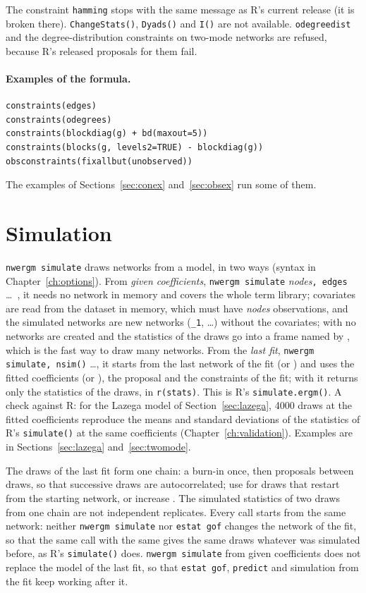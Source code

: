 \normalsize
The constraint \texttt{hamming} stops with the same message as R's current release (it is broken there). \texttt{ChangeStats()}, \texttt{Dyads()} and \texttt{I()} are not available. \texttt{odegreedist} and the degree-distribution constraints on two-mode networks are refused, because R's released proposals for them fail.

\paragraph{Examples of the formula.}
\begin{lstlisting}
constraints(edges)
constraints(odegrees)
constraints(blockdiag(g) + bd(maxout=5))
constraints(blocks(g, levels2=TRUE) - blockdiag(g))
obsconstraints(fixallbut(unobserved))
\end{lstlisting}
The examples of Sections~\ref{sec:conex} and~\ref{sec:obsex} run some of them.

\section{Simulation}\label{sec:simulate}

\texttt{nwergm simulate} draws networks from a model, in two ways (syntax in Chapter~\ref{ch:options}). From \emph{given coefficients}, \texttt{nwergm simulate} \emph{nodes}\texttt{, edges} \ldots\ , it needs no network in memory and covers the whole term library; covariates are read from the dataset in memory, which must have \emph{nodes} observations, and the simulated networks are new networks (\texttt{\_1}, \ldots) without the covariates; with  no networks are created and the statistics of the draws go into a frame named by , which is the fast way to draw many networks. From the \emph{last fit}, \texttt{nwergm simulate}\texttt{, nsim()} \ldots, it starts from the last network of the fit (or ) and uses the fitted coefficients (or ), the proposal and the constraints of the fit; with  it returns only the statistics of the draws, in \texttt{r(stats)}. This is R's \texttt{simulate.ergm()}. A check against R: for the Lazega model of Section~\ref{sec:lazega}, 4000 draws at the fitted coefficients reproduce the means and standard deviations of the statistics of R's \texttt{simulate()} at the same coefficients (Chapter~\ref{ch:validation}). Examples are in Sections~\ref{sec:lazega} and~\ref{sec:twomode}.

The draws of the last fit form one chain: a burn-in once, then  proposals between draws, so that successive draws are autocorrelated; use  for draws that restart from the starting network, or increase . The simulated statistics of two draws from one chain are not independent replicates. Every call starts from the same network: neither \texttt{nwergm simulate} nor \texttt{estat gof} changes the network of the fit, so that the same call with the same  gives the same draws whatever was simulated before, as R's \texttt{simulate()} does. \texttt{nwergm simulate} from given coefficients does not replace the model of the last fit, so that \texttt{estat gof}, \texttt{predict} and simulation from the fit keep working after it.
